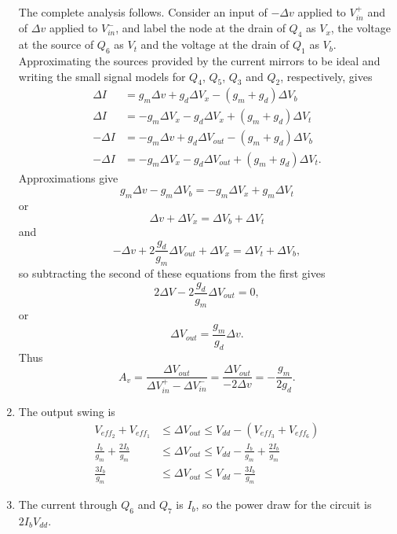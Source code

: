 \documentclass{article}
\begin{document}
\begin{enumerate}
{The complete analysis follows. Consider an input of $-\Delta v$ applied to
$V_{in}^{+}$ and of $\Delta v$ applied to $V_{in}^{-}$, and label the node
at the drain of $Q_4$ as $V_x$, the voltage at the source of $Q_6$ as $V_t$ 
and the voltage at the drain of $Q_1$ as $V_b$.  Approximating the
sources provided by the current mirrors to be ideal and writing the small 
signal models for $Q_4$, $Q_5$, $Q_3$ and $Q_2$, respectively, gives
\begin{align*}
\Delta I &= g_m \Delta v + g_d \Delta V_x - (g_m + g_d) \Delta V_b \\
\Delta I &= -g_m \Delta V_x - g_d \Delta V_x + (g_m + g_d) \Delta V_t \\
-\Delta I &= -g_m \Delta v + g_d \Delta V_{out} - (g_m + g_d) \Delta V_b \\
-\Delta I &= -g_m \Delta V_x - g_d \Delta V_{out} + (g_m + g_d) \Delta V_t.
\end{align*}
Approximations give
$$
g_m \Delta v - g_m \Delta V_b = -g_m \Delta V_x + g_m \Delta V_t
$$
or
$$
\Delta v + \Delta V_x = \Delta V_b + \Delta V_t
$$
and
$$
-\Delta v + 2\frac{g_d}{g_m} \Delta V_{out} + \Delta V_x = \Delta V_t + \Delta V_b,
$$
so subtracting the second of these equations from the first gives
$$
2 \Delta V - 2 \frac{g_d}{g_m} \Delta V_{out} = 0,
$$
or
$$
\Delta V_{out} = \frac{g_m}{g_d} \Delta v.
$$
Thus
$$
A_v = \frac{\Delta V_{out}}{\Delta V_{in}^+ - \Delta V_{in}^-}
    = \frac{\Delta V_{out}}{-2\Delta v} 
    = -\frac{g_m}{2 g_d}.
$$
}
\item
{
The output swing is 
\begin{align*}
V_{eff_2} + V_{eff_1} 
  &\leq \Delta V_{out} 
   \leq  V_{dd} - (V_{eff_3} + V_{eff_6}) \\
\frac{I_b}{g_m} + \frac{2 I_b}{g_m}
  &\leq \Delta V_{out}
   \leq  V_{dd} - \frac{I_b}{g_m} + \frac{2 I_b}{g_m} \\
\frac{3 I_b}{g_m} &\leq \Delta V_{out} \leq V_{dd} - \frac{3 I_b}{g_m}
\end{align*}
}
\item
{
The current through $Q_6$ and $Q_7$ is $I_b$, so the power draw for the circuit
is $2 I_b V_{dd}$.
}
\end{enumerate}
\end{document}
